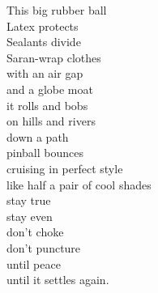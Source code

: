 This big rubber ball\\
Latex protects\\
Sealants divide\\
Saran-wrap clothes\\
with an air gap\\
and a globe moat\\
it rolls and bobs\\
on hills and rivers\\
down a path\\
pinball bounces\\
cruising in perfect style\\
like half a pair of cool shades\\
stay true\\
stay even\\
don't choke\\
don't puncture\\
until peace\\
until it settles again.\\


